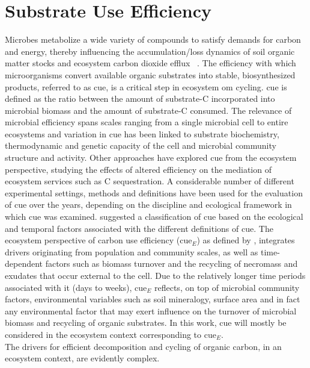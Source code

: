 \section{Substrate Use Efficiency }

	Microbes metabolize a wide variety of compounds to satisfy demands for \gls{carbon} and energy, thereby influencing the accumulation/loss dynamics of soil organic matter stocks and ecosystem carbon dioxide efflux \citep{xu2017} . The efficiency with which microorganisms convert available organic substrates into stable, biosynthesized products,   referred to as \gls{cue}, is a critical step in ecosystem \gls{om} cycling. \gls{cue} is defined as the ratio between the amount of substrate-C incorporated into microbial biomass and the amount of substrate-C consumed. The relevance of microbial efficiency spans scales ranging from a single microbial cell to entire ecosystems and variation in \gls{cue} has been linked to substrate biochemistry, thermodynamic and genetic capacity of the cell and microbial community structure and activity\citep{kallenbach2019, soares2019}. Other approaches have explored \gls{cue} from the ecosystem perspective, studying the effects of altered efficiency on the mediation of ecosystem services such as C sequestration. A considerable number of different experimental settings, methods and definitions have been used for the evaluation of \gls{cue} over the years, depending on the discipline and ecological framework in which \gls{cue} was examined. \citet{geyer2016} suggested a classification of \gls{cue} based on the ecological and temporal factors associated with the different definitions of \gls{cue}. The ecosystem perspective of carbon use efficiency (\gls{cue}$ _E $) as defined by \citet{geyer2016}, integrates drivers originating from population and community scales, as well as time-dependent factors such as biomass turnover and the recycling of necromass and exudates that occur external to the cell. Due to the relatively longer time periods associated with it (days to weeks), \gls{cue}$ _E $ reflects, on top of microbial community factors, environmental variables such as soil mineralogy, surface area and in fact any environmental factor that may exert influence on the turnover of microbial biomass and recycling of organic substrates. In this work, \gls{cue} will mostly be considered in the ecosystem context corresponding to \gls{cue}$ _E $.\\
	The drivers for efficient decomposition and cycling of organic carbon, in an ecosystem context, are evidently complex.
